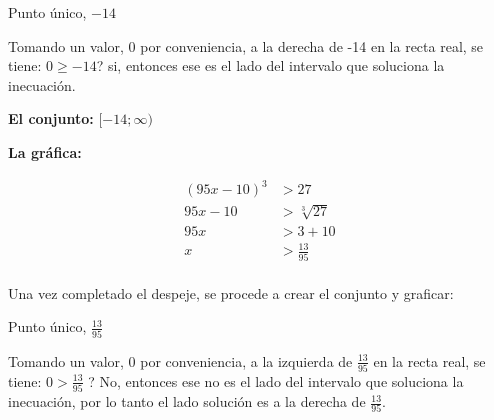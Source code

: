 \documentclass[12pt]{article}
\begin{document}
    Punto único, $-14$

    Tomando un valor, 0 por conveniencia, a la derecha de -14 en la recta real,
    se tiene: $0\geq -14$? si, entonces ese es el lado del intervalo que
    soluciona la inecuación.


    \textbf{El conjunto:} $[-14; \infty)$

    \textbf{La gráfica:}

    \vspace*{1cm}



   \begin{align*}
       (95x -10)^3 &> 27		\\
       95x -10 &> \sqrt[3]{27} \\
       95x &> 3 +10\\
       x &> \frac{13}{95} \\
   \end{align*}

    Una vez completado el despeje, se procede a crear el conjunto y graficar:

    Punto único, $\displaystyle\frac{13}{95}$

    Tomando un valor, 0 por conveniencia, a la izquierda de $\displaystyle\frac{13}{95}$
    en la recta real,
    se tiene: $\displaystyle0 > \frac{13}{95} $ ? No, entonces ese no es el lado del intervalo que
    soluciona la inecuación, por lo tanto el lado solución es a la derecha de
    $\displaystyle\frac{13}{95}$.
\end{document}
